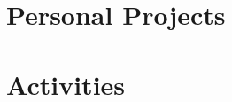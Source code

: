 \documentclass[]{deedy-resume-openfont-wjl}
\begin{document}
% 


%
%




%
%
\section{Personal Projects}







%
%




%
%
\sectionsep
\section{Activities}



% 





%
%





\end{document}
